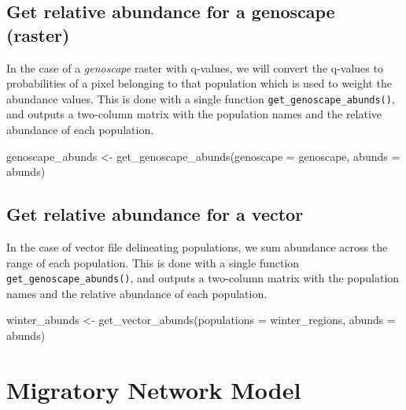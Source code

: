 \documentclass[
]{book}
\newenvironment{Shaded}{\begin{snugshade}}{\end{snugshade}}
\newcommand{\AttributeTok}[1]{\textcolor[rgb]{0.77,0.63,0.00}{#1}}
\newcommand{\FunctionTok}[1]{\textcolor[rgb]{0.00,0.00,0.00}{#1}}
\newcommand{\NormalTok}[1]{#1}
\newcommand{\OtherTok}[1]{\textcolor[rgb]{0.56,0.35,0.01}{#1}}
\begin{document}
\hypertarget{get-relative-abundance-for-a-genoscape-raster}{%
\section{Get relative abundance for a genoscape (raster)}\label{get-relative-abundance-for-a-genoscape-raster}}

In the case of a \emph{genoscape} raster with q-values, we will convert the q-values to probabilities of a pixel belonging to that population which is used to weight the abundance values. This is done with a single function \texttt{get\_genoscape\_abunds()}, and outputs a two-column matrix with the population names and the relative abundance of each population.

\begin{Shaded}
\begin{Highlighting}[]
\NormalTok{genoscape\_abunds }\OtherTok{\textless{}{-}} \FunctionTok{get\_genoscape\_abunds}\NormalTok{(}\AttributeTok{genoscape =}\NormalTok{ genoscape, }\AttributeTok{abunds =}\NormalTok{ abunds)}
\end{Highlighting}
\end{Shaded}

\hypertarget{get-relative-abundance-for-a-vector}{%
\section{Get relative abundance for a vector}\label{get-relative-abundance-for-a-vector}}

In the case of vector file delineating populations, we sum abundance across the range of each population. This is done with a single function \texttt{get\_genoscape\_abunds()}, and outputs a two-column matrix with the population names and the relative abundance of each population.

\begin{Shaded}
\begin{Highlighting}[]
\NormalTok{winter\_abunds }\OtherTok{\textless{}{-}} \FunctionTok{get\_vector\_abunds}\NormalTok{(}\AttributeTok{populations =}\NormalTok{ winter\_regions, }\AttributeTok{abunds =}\NormalTok{ abunds)}
\end{Highlighting}
\end{Shaded}

\hypertarget{connectivity}{%
\chapter{Migratory Network Model}\label{connectivity}}
\end{document}
